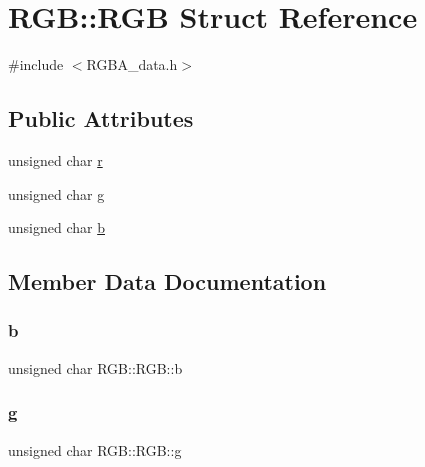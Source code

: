 \hypertarget{struct_r_g_b_1_1_r_g_b}{}\section{R\+GB\+:\+:R\+GB Struct Reference}
\label{struct_r_g_b_1_1_r_g_b}


{\ttfamily \#include $<$R\+G\+B\+A\+\_\+data.\+h$>$}

\subsection*{Public Attributes}
\begin{DoxyCompactItemize}
\item 
unsigned char \mbox{\hyperlink{struct_r_g_b_1_1_r_g_b_aabe74fea8bbe467208e73eeaea3c007b}{r}}
\item 
unsigned char \mbox{\hyperlink{struct_r_g_b_1_1_r_g_b_a60c963bb6a3564e4ebc69af4e0df22db}{g}}
\item 
unsigned char \mbox{\hyperlink{struct_r_g_b_1_1_r_g_b_aba402bd28605dd6b6ea64f892be1cbe6}{b}}
\end{DoxyCompactItemize}


\subsection{Member Data Documentation}
\mbox{\label{struct_r_g_b_1_1_r_g_b_aba402bd28605dd6b6ea64f892be1cbe6}} 
\subsubsection{\texorpdfstring{b}{b}}
{\footnotesize\ttfamily unsigned char R\+G\+B\+::\+R\+G\+B\+::b}

\mbox{\label{struct_r_g_b_1_1_r_g_b_a60c963bb6a3564e4ebc69af4e0df22db}} 
\subsubsection{\texorpdfstring{g}{g}}
{\footnotesize\ttfamily unsigned char R\+G\+B\+::\+R\+G\+B\+::g}

\mbox{\label{struct_r_g_b_1_1_r_g_b_aabe74fea8bbe467208e73eeaea3c007b}} 
